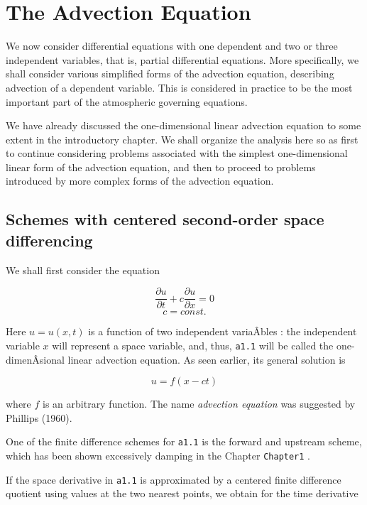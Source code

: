 \section{The Advection Equation}\label{Chapter3}

We now consider differential equations with one dependent and two or
three independent variables, that is, partial differential equations.
More specifically, we shall consider various simplified forms of the
advection equation, describing advection of a dependent variable. This
is considered in practice to be the most important part of the
atmospheric governing equations.

We have already discussed the one-dimensional linear advection equation
to some extent in the introductory chapter. We shall organize the
analysis here so as first to continue considering problems associated
with the simplest one-dimensional linear form of the advection equation,
and then to proceed to problems introduced by more complex forms of the
advection equation.

\subsection{\texorpdfstring{\textbf{Schemes with centered second-order
space
differencing}}{Schemes with centered second-order space differencing}}\label{Section3.1}

We shall first consider the equation

{\[\frac{\partial u}{\partial t}  +c\frac{\partial u}{\partial x} = 0\]\[c = const.\]}

Here \(u = u\left( x,t \right)\) is a function of two independent
variaÂ­bles : the independent variable \(x\) will represent a space
variable, and, thus, \texttt{a1.1} will be called the one-dimenÂ­sional
linear advection equation. As seen earlier, its general solution is

{\[u = f\left( x - ct \right)\]}

where \(f\) is an arbitrary function. The name \emph{advection equation}
was suggested by Phillips (1960).

One of the finite difference schemes for \texttt{a1.1} is the forward
and upstream scheme, which has been shown excessively damping in the
Chapter \texttt{Chapter1} .

If the space derivative in \texttt{a1.1} is approximated by a centered
finite difference quotient using values at the two nearest points, we
obtain for the time derivative

